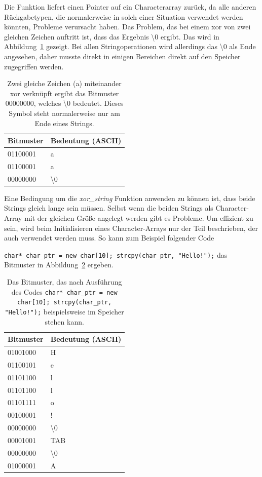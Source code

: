 \documentclass[]{article}
\begin{document}
Die Funktion liefert einen Pointer auf ein Characterarray zurück, da alle anderen Rückgabetypen, die normalerweise in solch einer Situation verwendet werden könnten, Probleme verursacht haben. Das Problem, das bei einem xor von zwei gleichen Zeichen auftritt ist, dass das Ergebnis \textbackslash 0 ergibt. Das wird in Abbildung~\ref{fig:xor_gleiches_zeichen} gezeigt. Bei allen Stringoperationen wird allerdings das \textbackslash 0 als Ende angesehen, daher musste direkt in einigen Bereichen direkt auf den Speicher zugegriffen werden.

\begin{table}[]
	\centering
	\begin{tabular}{l|l}
		Bitmuster  & Bedeutung (ASCII)\\ \hline
		01100001   & a                \\
		01100001   & a                \\ \hline
		00000000   & \textbackslash 0 \\
	\end{tabular}
	\caption{Zwei gleiche Zeichen (a) miteinander xor verknüpft ergibt das Bitmuster 00000000, welches \textbackslash 0 bedeutet. Dieses Symbol steht normalerweise nur am Ende eines Strings.}
	\label{fig:xor_gleiches_zeichen}
\end{table}

Eine Bedingung um die \textit{xor\_string} Funktion anwenden zu können ist, dass beide Strings gleich lange sein müssen. Selbst wenn die beiden Strings als Character-Array mit der gleichen Größe angelegt werden gibt es Probleme. Um effizient zu sein, wird beim Initialisieren eines Character-Arrays nur der Teil beschrieben, der auch verwendet werden muss. So kann zum Beispiel folgender Code

\noindent
\lstinline|char* char_ptr = new char[10]; strcpy(char_ptr, "Hello!");| das Bitmuster in Abbildung~\ref{fig:bitcode_char_array} ergeben.

\begin{table}[]
	\centering
	\begin{tabular}{l|l}
		Bitmuster  & Bedeutung (ASCII)\\ \hline
		01001000   & H                \\
		01100101   & e                \\
		01101100   & l                \\
		01101100   & l                \\
		01101111   & o                \\
		00100001   & !                \\
		00000000   & \textbackslash 0 \\
		00001001   & TAB              \\
		00000000   & \textbackslash 0 \\		
		01000001   & A                \\		
	\end{tabular}
	\caption{Das Bitmuster, das nach Ausführung des Codes \lstinline|char* char_ptr = new char[10]; strcpy(char_ptr, "Hello!");| beispielsweise im Speicher stehen kann.}
	\label{fig:bitcode_char_array}
\end{table}
\end{document}
